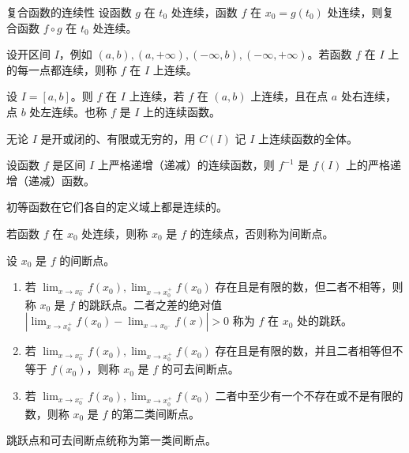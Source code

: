 \begin{theorem}{复合函数的连续性}
    设函数 $g$ 在 $t_0$ 处连续，函数 $f$ 在 $x_0 = g(t_0)$ 处连续，则复合函数 $f \circ g$ 在 $t_0$ 处连续。
\end{theorem}

\begin{definition}
    设开区间 $I$，例如 $(a, b), (a, +\infty), (-\infty, b), (-\infty, +\infty)$。若函数 $f$ 在 $I$ 上的每一点都连续，则称 $f$ 在 $I$ 上连续。

    设 $I = [a, b]$。则 $f$ 在 $I$ 上连续，若 $f$ 在 $(a, b)$ 上连续，且在点 $a$ 处右连续，点 $b$ 处左连续。也称 $f$ 是 $I$ 上的连续函数。

    无论 $I$ 是开或闭的、有限或无穷的，用 $C(I)$ 记 $I$ 上连续函数的全体。
\end{definition}

\begin{theorem}
  设函数 $f$ 是区间 $I$ 上严格递增（递减）的连续函数，则 $f^{-1}$ 是 $f(I)$ 上的严格递增（递减）函数。
\end{theorem}

\begin{theorem}
  初等函数在它们各自的定义域上都是连续的。
\end{theorem}

\begin{definition}
  若函数 $f$ 在 $x_0$ 处连续，则称 $x_0$ 是 $f$ 的连续点，否则称为间断点。
\end{definition}

\begin{definition}
  设 $x_0$ 是 $f$ 的间断点。
  \begin{enumerate}
    \item 若 $\displaystyle \lim_{x \to x_{0}^{-}}f(x_0), \lim_{x \to x_{0}^{+}}f(x_0)$ 存在且是有限的数，但二者不相等，则称 $x_0$ 是 $f$ 的跳跃点。二者之差的绝对值 $|\displaystyle \lim_{x \to x_{0}^{+}}f(x_0) - \lim_{x \to x_{0^{-}}}f(x)| > 0$ 称为 $f$ 在 $x_0$ 处的跳跃。
    \item 若 $\displaystyle \lim_{x \to x_{0}^{-}}f(x_0), \lim_{x \to x_{0}^{+}}f(x_0)$ 存在且是有限的数，并且二者相等但不等于 $f(x_0)$，则称 $x_0$ 是 $f$ 的可去间断点。
    \item 若 $\displaystyle \lim_{x \to x_{0}^{-}}f(x_0), \lim_{x \to x_{0}^{+}}f(x_0)$ 二者中至少有一个不存在或不是有限的数，则称 $x_0$ 是 $f$ 的第二类间断点。
  \end{enumerate}
  跳跃点和可去间断点统称为第一类间断点。
\end{definition}

